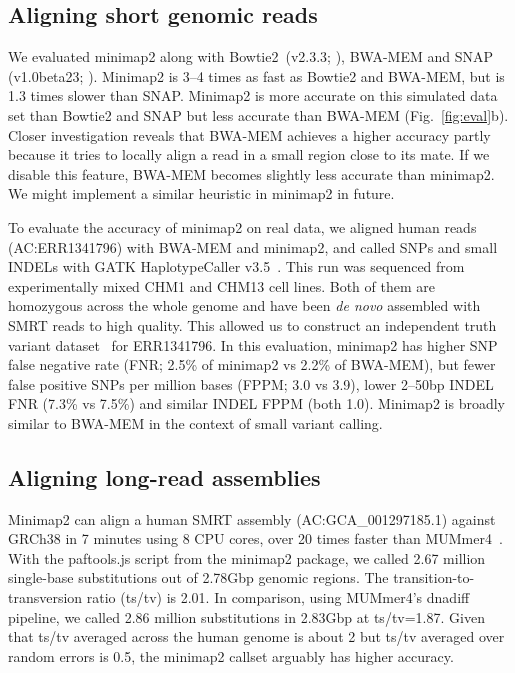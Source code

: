 \documentclass{bioinfo}
\begin{document}
\subsection{Aligning short genomic reads}

We evaluated minimap2 along with Bowtie2~(v2.3.3; \citealt{Langmead:2012fk}), BWA-MEM and
SNAP (v1.0beta23; \citealt{Zaharia:2011aa}). Minimap2 is 3--4 times as fast as Bowtie2 and
BWA-MEM, but is 1.3 times slower than SNAP. Minimap2 is more accurate on this
simulated data set than Bowtie2 and SNAP but less accurate than BWA-MEM
(Fig.~\ref{fig:eval}b). Closer investigation reveals that BWA-MEM achieves
a higher accuracy partly because it tries to locally align a read in a small
region close to its mate. If we disable this feature, BWA-MEM becomes slightly
less accurate than minimap2. We might implement a similar heuristic
in minimap2 in future.

To evaluate the accuracy of minimap2 on real data, we aligned human reads
(AC:ERR1341796) with BWA-MEM and minimap2, and called SNPs and small INDELs
with GATK HaplotypeCaller v3.5~\citep{Depristo:2011vn}. This run was sequenced
from experimentally mixed CHM1 and CHM13 cell lines. Both of them are homozygous
across the whole genome and have been \emph{de novo} assembled with SMRT reads
to high quality. This allowed us to construct an independent truth variant
dataset~\citep{Li223297} for
ERR1341796. In this evaluation, minimap2 has higher SNP false negative rate
(FNR; 2.5\% of minimap2 vs 2.2\% of BWA-MEM), but fewer false positive SNPs per
million bases (FPPM; 3.0 vs 3.9), lower 2--50bp INDEL FNR (7.3\% vs 7.5\%) and
similar INDEL FPPM (both 1.0). Minimap2 is broadly similar to BWA-MEM in the
context of small variant calling.

\subsection{Aligning long-read assemblies}

Minimap2 can align a human SMRT assembly (AC:GCA\_001297185.1) against
GRCh38 in 7 minutes using 8 CPU cores, over 20 times faster than
MUMmer4~\citep{Marcais:2018aa}. With the paftools.js script from the minimap2
package, we called 2.67 million single-base substitutions out of 2.78Gbp
genomic regions. The transition-to-transversion ratio (ts/tv) is 2.01. In
comparison, using MUMmer4's dnadiff pipeline, we called 2.86 million
substitutions in 2.83Gbp at ts/tv=1.87. Given that ts/tv averaged across the
human genome is about 2 but ts/tv averaged over random errors is 0.5, the
minimap2 callset arguably has higher accuracy.
\end{document}
